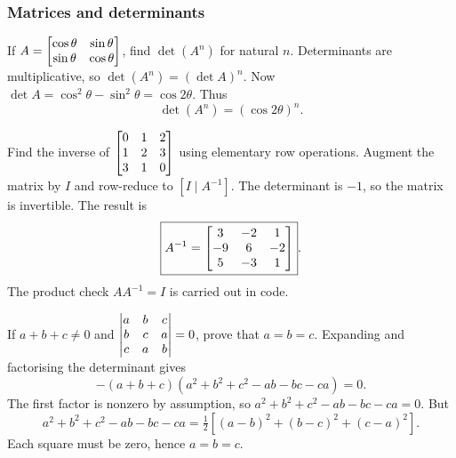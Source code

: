 \subsubsection{Matrices and determinants}
\begin{enumerate}[label={},leftmargin=0pt,itemsep=9pt]
 If $A=\begin{bmatrix}\cos\theta&\sin\theta\\\sin\theta&\cos\theta\end{bmatrix}$, find $\det(A^n)$ for natural $n$.
\solution Determinants are multiplicative, so $\det(A^n)=(\det A)^n$. Now $\det A=\cos^2\theta-\sin^2\theta=\cos2\theta$. Thus
\[
\boxed{\det(A^n)=(\cos2\theta)^n}.
\]

 Find the inverse of $\begin{bmatrix}0&1&2\\1&2&3\\3&1&0\end{bmatrix}$ using elementary row operations.
\solution Augment the matrix by $I$ and row-reduce to $[I\mid A^{-1}]$. The determinant is $-1$, so the matrix is invertible. The result is
\[
\boxed{A^{-1}=\begin{bmatrix}3&-2&1\\-9&6&-2\\5&-3&1\end{bmatrix}}.
\]
The product check $AA^{-1}=I$ is carried out in code.

 If $a+b+c\ne0$ and $\begin{vmatrix}a&b&c\\b&c&a\\c&a&b\end{vmatrix}=0$, prove that $a=b=c$.
\solution Expanding and factorising the determinant gives
\[
-(a+b+c)(a^2+b^2+c^2-ab-bc-ca)=0.
\]
The first factor is nonzero by assumption, so $a^2+b^2+c^2-ab-bc-ca=0$. But
\[
a^2+b^2+c^2-ab-bc-ca=\tfrac12[(a-b)^2+(b-c)^2+(c-a)^2].
\]
Each square must be zero, hence $\boxed{a=b=c}$.


\end{enumerate}
